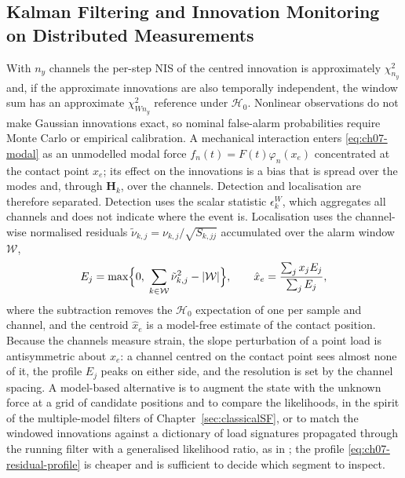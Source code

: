 \subsection{Kalman Filtering and Innovation Monitoring on Distributed Measurements}
\label{subsec:cable-kf-monitoring}
With $n_y$ channels the per-step NIS of the centred innovation is approximately $\chi^{2}_{n_y}$ and, if the approximate innovations are also temporally independent, the window sum has an approximate $\chi^2_{Wn_y}$ reference under $\mathcal{H}_0$. Nonlinear observations do not make Gaussian innovations exact, so nominal false-alarm probabilities require Monte Carlo or empirical calibration. A mechanical interaction enters \eqref{eq:ch07-modal} as an unmodelled modal force $f_n(t)=F(t)\varphi_n(x_e)$ concentrated at the contact point $x_e$; its effect on the innovations is a bias that is spread over the modes and, through $\mathbf{H}_k$, over the channels. Detection and localisation are therefore separated. Detection uses the scalar statistic $\epsilon_k^{W}$, which aggregates all channels and does not indicate where the event is. Localisation uses the channel-wise normalised residuals $\tilde\nu_{k,j}=\nu_{k,j}/\sqrt{S_{k,jj}}$ accumulated over the alarm window $\mathcal{W}$,
\begin{equation}
E_j=\max\Bigl\{0,\;\sum_{k\in\mathcal{W}}\tilde\nu_{k,j}^{2}-|\mathcal{W}|\Bigr\},
\qquad
\hat x_e=\frac{\sum_j x_j E_j}{\sum_j E_j},
\label{eq:ch07-residual-profile}
\end{equation}
where the subtraction removes the $\mathcal{H}_0$ expectation of one per sample and channel, and the centroid $\hat x_e$ is a model-free estimate of the contact position. Because the channels measure strain, the slope perturbation of a point load is antisymmetric about $x_e$: a channel centred on the contact point sees almost none of it, the profile $E_j$ peaks on either side, and the resolution is set by the channel spacing. A model-based alternative is to augment the state with the unknown force at a grid of candidate positions and to compare the likelihoods, in the spirit of the multiple-model filters of Chapter~\ref{sec:classicalSF}, or to match the windowed innovations against a dictionary of load signatures propagated through the running filter with a generalised likelihood ratio, as in \cite{oliva_quadratic_ejc_2026}; the profile \eqref{eq:ch07-residual-profile} is cheaper and is sufficient to decide which segment to inspect.



